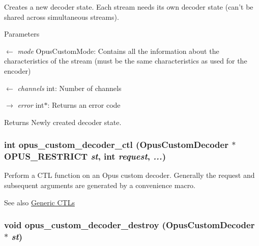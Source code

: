 Creates a new decoder state. Each stream needs its own decoder state (can't be shared across simultaneous streams). 
\begin{DoxyParams}{Parameters}
\item[\mbox{$\leftarrow$} {\em mode}]{\ttfamily OpusCustomMode}: Contains all the information about the characteristics of the stream (must be the same characteristics as used for the encoder) \item[\mbox{$\leftarrow$} {\em channels}]{\ttfamily int}: Number of channels \item[\mbox{$\rightarrow$} {\em error}]{\ttfamily int$\ast$}: Returns an error code \end{DoxyParams}
\begin{DoxyReturn}{Returns}
Newly created decoder state. 
\end{DoxyReturn}
\hypertarget{group__opus__custom_ga88b9248e497f3c1b894f035011c569a9}{
\subsubsection[{opus\_\-custom\_\-decoder\_\-ctl}]{\setlength{\rightskip}{0pt plus 5cm}int opus\_\-custom\_\-decoder\_\-ctl ({\bf OpusCustomDecoder} $\ast$OPUS\_\-RESTRICT {\em st}, \/  int {\em request}, \/   {\em ...})}}
\label{group__opus__custom_ga88b9248e497f3c1b894f035011c569a9}


Perform a CTL function on an Opus custom decoder. Generally the request and subsequent arguments are generated by a convenience macro. \begin{DoxySeeAlso}{See also}
\hyperlink{group__opus__genericctls}{Generic CTLs} 
\end{DoxySeeAlso}
\hypertarget{group__opus__custom_ga0e59e6389bd6478e9c3be48aff4459e1}{
\subsubsection[{opus\_\-custom\_\-decoder\_\-destroy}]{\setlength{\rightskip}{0pt plus 5cm}void opus\_\-custom\_\-decoder\_\-destroy ({\bf OpusCustomDecoder} $\ast$ {\em st})}}
\label{group__opus__custom_ga0e59e6389bd6478e9c3be48aff4459e1}


